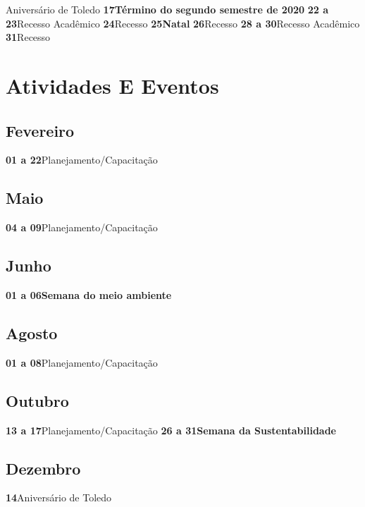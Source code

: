 \documentclass[thesis]{hmcposter}
\begin{document}
\begin{poster}
\quad \quad Aniversário de Toledo \newline\textbf{17}\quad \quad \quad \quad \textbf{Término do segundo semestre de 2020} \newline\textbf{22 a 23}\quad \quad Recesso Acadêmico \newline\textbf{24}\quad \quad \quad \quad Recesso \newline\textbf{25}\quad \quad \quad \quad \textbf{Natal} \newline\textbf{26}\quad \quad \quad \quad Recesso \newline\textbf{28 a 30}\quad \quad Recesso Acadêmico \newline\textbf{31}\quad \quad \quad \quad Recesso \newline\newpage
\section{\color{hmcorange}Atividades E Eventos}\subsection{Fevereiro}\textbf{01 a 22}\quad \quad Planejamento/Capacitação \newline\subsection{Maio}\textbf{04 a 09}\quad \quad Planejamento/Capacitação \newline\subsection{Junho}\textbf{01 a 06}\quad \quad \textbf{Semana do meio ambiente} \newline\subsection{Agosto}\textbf{01 a 08}\quad \quad Planejamento/Capacitação \newline\subsection{Outubro}\textbf{13 a 17}\quad \quad Planejamento/Capacitação \newline\textbf{26 a 31}\quad \quad \textbf{Semana da Sustentabilidade} \newline\subsection{Dezembro}\textbf{14}\quad \quad \quad \quad Aniversário de Toledo \newline\end{poster}
\end{document}
